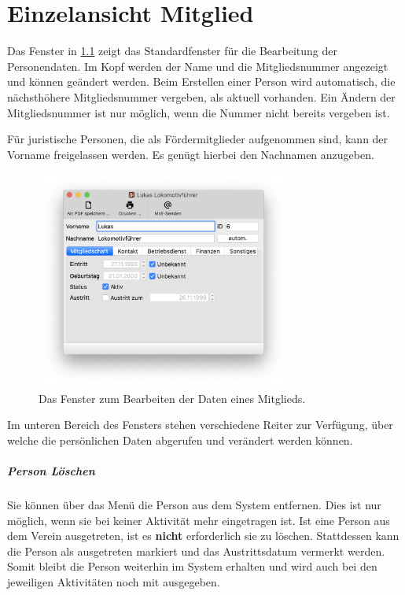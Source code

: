 \chapter{Einzelansicht Mitglied}\label{personal:person}
Das Fenster in \cref{fig:personal:person} zeigt das Standardfenster für die Bearbeitung der Personendaten.
Im Kopf werden der Name und die Mitgliedsnummer angezeigt und können geändert werden.
Beim Erstellen einer Person wird automatisch, die nächsthöhere Mitgliedsnummer vergeben, als aktuell vorhanden.
Ein Ändern der Mitgliedsnummer ist nur möglich, wenn die Nummer nicht bereits vergeben ist.

Für juristische Personen, die als Fördermitglieder aufgenommen sind, kann der Vorname freigelassen werden.
Es genügt hierbei den Nachnamen anzugeben.

\begin{figure}[!h]
  \centering
	\includegraphics[width=0.75\textwidth]{img/personal-person}
	\caption{Das Fenster zum Bearbeiten der Daten eines Mitglieds.}
	\label{fig:personal:person}
\end{figure}


Im unteren Bereich des Fensters stehen verschiedene Reiter zur Verfügung,
über welche die persönlichen Daten abgerufen und verändert werden können.


\paragraph{Person Löschen}
Sie können über das Menü  die Person aus dem System entfernen.
Dies ist nur möglich, wenn sie bei keiner Aktivität mehr eingetragen ist.
Ist eine Person aus dem Verein ausgetreten, ist es \textbf{nicht} erforderlich sie zu löschen.
Stattdessen kann die Person als ausgetreten markiert und das Austrittsdatum vermerkt werden.
Somit bleibt die Person weiterhin im System erhalten und wird auch bei den jeweiligen Aktivitäten noch mit ausgegeben.



